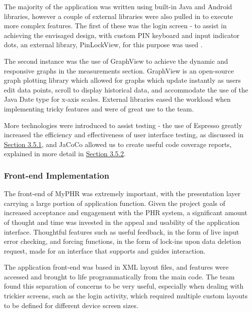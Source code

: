 \documentclass{l3proj}
\begin{document}
The majority of the application was written using built-in Java and Android libraries, however a couple of external libraries were also pulled in to execute more complex features. The first of these was the login screen - to assist in achieving the envisaged design, with custom PIN keyboard and input indicator dots, an external library, PinLockView, for this purpose was used \cite{pinlock}. 

The second instance was the use of GraphView \cite{graph-view} to achieve the dynamic and responsive graphs in the measurements section. GraphView is an open-source graph plotting library which allowed for graphs which update instantly as users edit data points, scroll to display historical data, and accommodate the use of the Java Date type for x-axis scales. External libraries eased the workload when implementing tricky features and were of great use to the team.

More technologies were introduced to assist testing - the use of Espresso \cite{espresso} greatly increased the efficiency and effectiveness of user interface testing, as discussed in \hyperref[sec:3.5.1]{Section 3.5.1}, and JaCoCo \cite{jacoco} allowed us to create useful code coverage reports, explained in more detail in \hyperref[sec:3.5.2]{Section 3.5.2}.


\subsubsection{Front-end Implementation} \label{sec:3.3.2}
The front-end of MyPHR was extremely important, with the presentation layer carrying a large portion of application function. Given the project goals of increased acceptance and engagement with the PHR system, a significant amount of thought and time was invested in the appeal and usability of the application interface. Thoughtful features such as useful feedback, in the form of live input error checking, and forcing functions, in the form of lock-ins \cite{lock-ins} upon data deletion request, made for an interface that supports and guides interaction.

The application front-end was based in XML layout files, and features were accessed and brought to life programmatically from the main code. The team found this separation of concerns to be very useful, especially when dealing with trickier screens, such as the login activity, which required multiple custom layouts to be defined for different device screen sizes.
\end{document}
